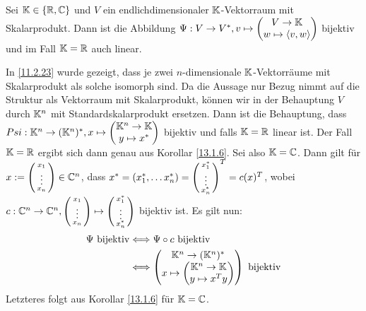 \documentclass[../../main.tex]{subfiles}
\begin{document}
\begin{kor}\label{13.1.7}
	Sei $\mathbb K\in \{\mathbb R, \mathbb C\}$ und $V$ ein endlichdimensionaler $\mathbb K$-Vektorraum mit Skalarprodukt. Dann ist die Abbildung $\Psi: V\to V^*, v\mapsto\begin{pmatrix*}V\to \K \\w\mapsto \scal{v,w}\end{pmatrix*}$  bijektiv und im Fall $\mathbb K=\mathbb R$ auch linear.
\end{kor}
\begin{cproof}
	In \ref{11.2.23} wurde gezeigt, dass je zwei $n$-dimensionale $\mathbb K$-Vektorräume mit Skalarprodukt als solche isomorph sind. Da die Aussage nur Bezug nimmt auf die Struktur als Vektorraum mit Skalarprodukt, können wir in der Behauptung $V$ durch $\mathbb K^n$ mit Standardskalarprodukt ersetzen. Dann ist die Behauptung, dass $Psi: \K^n\to (\K^n)^*, x\mapsto\begin{pmatrix*}\K^n\to \K \\y\mapsto x^*\end{pmatrix*}$ bijektiv und falls $\mathbb K=\mathbb R$ linear ist. Der Fall $\mathbb K=\mathbb R$ ergibt sich dann genau aus Korollar \ref{13.1.6}. Sei also $\mathbb K=\mathbb C$. Dann gilt für $x:=\left(\begin{smallmatrix}x_1\\\vdots\\x_n\end{smallmatrix}\right)\in \mathbb C^n$, dass    
	$x^*=(x_1^*,\ldots x_n^*)=\left(\begin{smallmatrix}x_1^*\\\vdots\\x_n^*\end{smallmatrix}\right)^T=c(x)^T$, wobei $c: \mathbb C^n\to \mathbb C^n,\left(\begin{smallmatrix}x_1\\\vdots\\x_n\end{smallmatrix}\right)\mapsto \left(\begin{smallmatrix}x_1^*\\\vdots\\x_n^*\end{smallmatrix}\right)$ bijektiv ist. Es gilt nun:
	\begin{align*}
		\Psi\text{ bijektiv}&\Longleftrightarrow \Psi\circ c\text{ bijektiv}\\
		&\Longleftrightarrow\begin{pmatrix*}\K^n\to (\K^n)^*\\ x\mapsto \begin{pmatrix*}\K^n\to \K\\ y\mapsto x^Ty
		\end{pmatrix*}\end{pmatrix*}\text{ bijektiv}
	\end{align*}
	Letzteres folgt aus Korollar \ref{13.1.6} für $\mathbb K=\mathbb C$.
\end{cproof}
\end{document}
